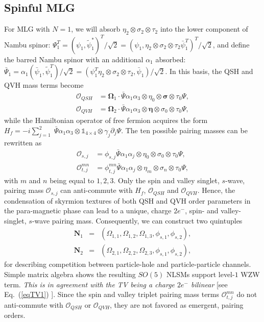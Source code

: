 \documentclass[aps,prb,amsmath,amssymb,floatfix,twocolumn]{revtex4}
\begin{document}
\subsection{Spinful MLG} For MLG with $N=1$, we will absorb $\eta_2\otimes\sigma_2\otimes\tau_2$ into the lower component of Nambu spinor: $\Psi^T_1=(\psi_1,\tilde{\psi}^*_1)^T/\sqrt{2}=(\psi_1,\eta_2\otimes\sigma_2\otimes\tau_2\bar{\psi}^T_1)^T/\sqrt{2}$, and define the barred Nambu spinor with an additional $\alpha_1$ absorbed: $\bar{\Psi}_1=\alpha_1(\bar{\psi}_1,\tilde{\psi}^T_1)/\sqrt{2}=(\psi^T_1\eta_2\otimes\sigma_2\otimes\tau_2,\bar{\psi}_1)/\sqrt{2}$. In this basis, the QSH and QVH mass terms become 
\begin{align}
\mathcal{O}_{QSH}&=\mathbf{\Omega}_1 \cdot \bar{\Psi} \alpha_1\alpha_3\otimes\eta_0\otimes\boldsymbol \sigma\otimes\tau_0 \Psi, \\
\mathcal{O}_{QVH}&= \mathbf{\Omega}_2 \cdot \bar{\Psi} \alpha_1\alpha_3\otimes \boldsymbol \eta \otimes\sigma_0\otimes\tau_0 \Psi, 
\end{align}
while the Hamiltonian operator of free fermion acquires the form $H_f= - i \sum_{j=1}^{2} \; \bar{\Psi} \alpha_1\alpha_3 \otimes \mathbb{1}_{4 \times 4} \otimes  \gamma_j \partial_j \Psi$. The ten possible pairing masses can be rewritten as 
\begin{align}
\mathcal{O}_{s,j}&=\phi_{s,j} \bar{\Psi} \alpha_1\alpha_j \otimes \eta_0 \otimes \sigma_0 \otimes \tau_0 \Psi, \\
\mathcal{O}^{mn}_{t,j}&=\phi_{t,j}^{mn} \bar{\Psi} \alpha_1\alpha_j \otimes \eta_m \otimes \sigma_n \otimes \tau_0 \Psi, 
\end{align}
with $m$ and $n$ being equal to $1,2,3$. Only the spin and valley singlet, $s$-wave, pairing mass $\mathcal{O}_{s,j}$ can anti-commute with $H_f$, $\mathcal{O}_{QSH}$ and $\mathcal{O}_{QVH}$. Hence, the condensation of skyrmion textures of both QSH and QVH order parameters in the para-magnetic phase can lead to a unique, charge $2e^-$, spin- and valley- singlet, $s$-wave pairing mass. Consequently, we can construct two quintuples 
\begin{eqnarray}
\mathbf{N}_{1}&=&(\Omega_{1,1}, \Omega_{1,2}, \Omega_{1,3}, \phi_{s,1}, \phi_{s,2}), \\
\mathbf{N}_{2}&=&(\Omega_{2,1}, \Omega_{2,2}, \Omega_{2,3}, \phi_{s,1}, \phi_{s,2}), 
 \end{eqnarray} 
for describing competition between particle-hole and particle-particle channels. Simple matrix algebra shows the resulting $SO(5)$ NLSMs support level-$1$ WZW term. \emph{This is in agreement with the TV being a charge $2e^-$ bilinear} [see Eq.~(\ref{eqTV1}) ].  Since the spin and valley triplet pairing mass terms $\mathcal{O}^{mn}_{t,j}$ do not anti-commute with $\mathcal{O}_{QSH}$ or $\mathcal{O}_{QVH}$, they are not favored as emergent, pairing orders.
\end{document}
